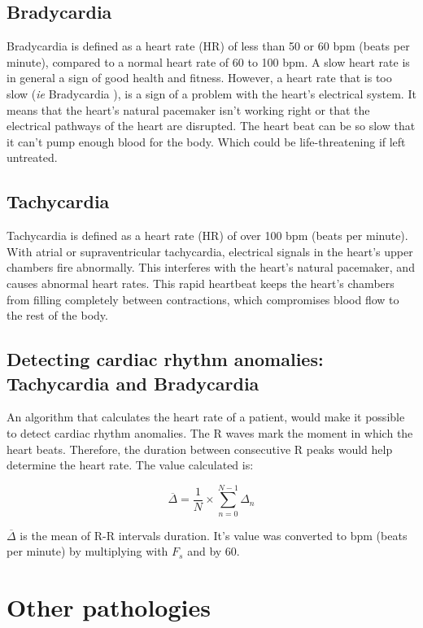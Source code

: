 \documentclass{article}
\begin{document}
\subsection{Bradycardia}

Bradycardia is defined as a heart rate (HR) of less than 50 or 60 bpm (beats per minute), compared to a normal heart rate of 60 to 100 bpm. A slow heart rate is in general a sign of good health and fitness. However, a heart rate that is too slow (\textit{ie} Bradycardia ), is a sign of a problem with the heart's electrical system. It means that the heart's natural pacemaker isn't working right or that the electrical pathways of the heart are disrupted. The heart beat can be so slow that it can't pump enough blood for the body. Which could be life-threatening if left untreated.

\subsection{Tachycardia}
 
Tachycardia is defined as a heart rate (HR) of over 100 bpm (beats per minute). With atrial or supraventricular tachycardia, electrical signals in the heart’s upper chambers fire abnormally. This interferes with the heart’s natural pacemaker, and causes abnormal heart rates. This rapid heartbeat keeps the heart’s chambers from filling completely between contractions, which compromises blood flow to the rest of the body. 

\subsection{Detecting cardiac rhythm anomalies: Tachycardia and Bradycardia}

An algorithm that calculates the heart rate of a patient, would make it possible to detect cardiac rhythm anomalies. The R waves mark the moment in which the heart beats. Therefore, the duration between consecutive R peaks would help determine the heart rate.
The value calculated is:

\begin{equation}
    \overline{\Delta} = \frac{1}{N}\times\sum_{n=0}^{N-1}\Delta_n
\end{equation}

$\overline{\Delta}$ is the mean of R-R intervals duration. It's value was converted to bpm (beats per minute) by multiplying with \textit{$F_s$} and by 60.


\section{Other pathologies}
\end{document}
